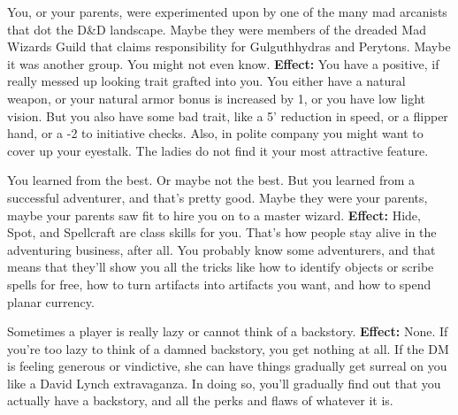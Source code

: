 \medskip{}
{You, or your parents, were experimented upon by one of the many mad arcanists that dot the D\&D landscape. Maybe they were members of the dreaded Mad Wizards Guild that claims responsibility for Gulguthhydras and Perytons. Maybe it was another group. You might not even know.}
\textbf{Effect:}{ You have a positive, if really messed up looking trait grafted into you. You either have a natural weapon, or your natural armor bonus is increased by 1, or you have low light vision. But you also have some bad trait, like a 5' reduction in speed, or a flipper hand, or a -2 to initiative checks. Also, in polite company you might want to cover up your eyestalk. The ladies do not find it your most attractive feature.}

\medskip{}
{You learned from the best. Or maybe not the best. But you learned from a successful adventurer, and that's pretty good. Maybe they were your parents, maybe your parents saw fit to hire you on to a master wizard.}
\textbf{Effect:}{ Hide, Spot, and Spellcraft are class skills for you. That's how people stay alive in the adventuring business, after all. You probably know some adventurers, and that means that they'll show you all the tricks like how to identify objects or scribe spells for free, how to turn artifacts into artifacts you want, and how to spend planar currency.}

\medskip{}
{Sometimes a player is really lazy or cannot think of a backstory.}
\textbf{Effect:}{ None. If you're too lazy to think of a damned backstory, you get nothing at all. If the DM is feeling generous or vindictive, she can have things gradually get surreal on you like a David Lynch extravaganza. In doing so, you'll gradually find out that you actually have a backstory, and all the perks and flaws of whatever it is.}
